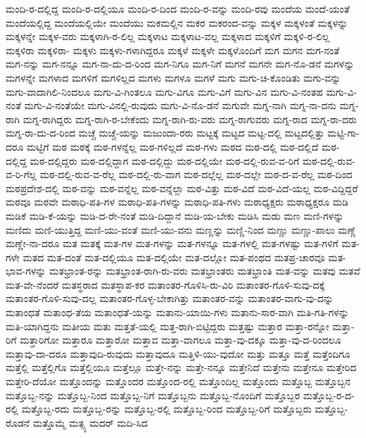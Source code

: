 {ಮಂದಿ-ರ-ದಲ್ಲಿದ್ದ
ಮಂದಿ-ರ-ದಲ್ಲಿಯೂ
ಮಂದಿ-ರ-ದಿಂದ
ಮಂದಿ-ರ-ವನ್ನು
ಮಂದಿ-ರವು
ಮಂದೆಯ
ಮಂದೆ-ಯಂತೆ
ಮಂದೆಯಲ್ಲಿದ್ದ
ಮಂದೆಯಲ್ಲಿಯೇ
ಮಂದೆಯು
ಮಕಮಲ್ಲಿನ
ಮಕರ
ಮಕರಂದ-ವನ್ನು
ಮಕ್ಕಳ
ಮಕ್ಕಳಂತೆ
ಮಕ್ಕಳನ್ನು
ಮಕ್ಕಳನ್ನೇ
ಮಕ್ಕಳ-ವರು
ಮಕ್ಕಳಾಗಿ-ರ-ಲಿಲ್ಲ
ಮಕ್ಕಳಾಟ
ಮಕ್ಕಳಾಟ-ವಲ್ಲ
ಮಕ್ಕಳಾದ
ಮಕ್ಕಳಿಗೆ
ಮಕ್ಕಳಿ-ರ-ಲಿಲ್ಲ
ಮಕ್ಕಳಿರಾ
ಮಕ್ಕಳಿರಾ-
ಮಕ್ಕಳು
ಮಕ್ಕಳು-ಗಳಾಗಿದ್ದರೂ
ಮಕ್ಕಳೆ
ಮಕ್ಕಳೇ
ಮಕ್ಕಳೊಂದಿಗೆ
ಮಗ
ಮಗನ
ಮಗ-ನಂತೆ
ಮಗ-ನನ್ನು
ಮಗ-ನನ್ನೂ
ಮಗ-ನಾ-ದು-ದ-ರಿಂದ
ಮಗ-ನಿಗೂ
ಮಗ-ನಿಗೆ
ಮಗನೆ
ಮಗನೇ
ಮಗ-ನೊ-ಡನೆ
ಮಗಳನ್ನು
ಮಗಳನ್ನೇ
ಮಗಳಾದ
ಮಗಳಿಗೆ
ಮಗಳಿಲ್ಲದ
ಮಗಳು
ಮಗಳೂ
ಮಗಳೆ
ಮಗು
ಮಗು-ಚಿ-ಕೊಂಡಿತು
ಮಗು-ವನ್ನು
ಮಗು-ವಾದಾಗಿಲಿ-ನಿಂದಲೂ
ಮಗು-ವಿ-ಗಿಂತಲೂ
ಮಗು-ವಿಗೂ
ಮಗು-ವಿಗೆ
ಮಗು-ವಿನ
ಮಗು-ವಿ-ನಂತಹ
ಮಗು-ವಿ-ನಂತೆ
ಮಗು-ವಿ-ನಂತೆಯೇ
ಮಗು-ವಿನಲ್ಲಿ-ರುವುದು
ಮಗು-ವಿ-ನೊ-ಡನೆ
ಮಗುವೇ
ಮಗ್ನ-ನಾಗಿ
ಮಗ್ನ-ನಾ-ದನು
ಮಗ್ನ-ರಾಗಿ
ಮಗ್ನ-ರಾಗಿದ್ದರು
ಮಗ್ನ-ರಾಗಿ-ರ-ಬೇಕೆಂದು
ಮಗ್ನ-ರಾಗಿ-ರು-ವರು
ಮಗ್ನ-ರಾಗುವರು
ಮಗ್ನ-ರಾದ
ಮಗ್ನ-ರಾ-ದರು
ಮಗ್ನ-ರಾ-ದು-ದ-ರಿಂದ
ಮಚ್ಚೆ
ಮಚ್ಚೆ-ಯನ್ನು
ಮಜುಂದಾ-ರರು
ಮಟ್ಟಕ್ಕೆ
ಮಟ್ಟದ
ಮಟ್ಟ-ದಲ್ಲಿ
ಮಟ್ಟದಲ್ಲಿತ್ತು
ಮಟ್ಟಿ-ಗಾ-ದರೂ
ಮಟ್ಟಿಗೆ
ಮಠ
ಮಠಕ್ಕೆ
ಮಠ-ಗಳನ್ನೆಲ್ಲ
ಮಠ-ಗಳಿಲ್ಲದೆ
ಮಠ-ಗಳು
ಮಠದ
ಮಠ-ದಲ್ಲಿ
ಮಠ-ದಲ್ಲಿದೆ
ಮಠ-ದಲ್ಲಿದ್ದ
ಮಠ-ದಲ್ಲಿದ್ದರು
ಮಠ-ದಲ್ಲಿದ್ದಾಗ
ಮಠ-ದಲ್ಲಿದ್ದು
ಮಠ-ದಲ್ಲಿಯೇ
ಮಠ-ದಲ್ಲಿ-ರುವ-ವ-ರಿಗೆ
ಮಠ-ದಲ್ಲಿ-ರುವ-ವ-ರಿ-ಗೆಲ್ಲ
ಮಠ-ದಲ್ಲಿ-ರುವ-ವ-ರೆಲ್ಲ
ಮಠ-ದಲ್ಲಿ-ರು-ವಾಗ
ಮಠ-ದಲ್ಲೆಲ್ಲ
ಮಠ-ದಲ್ಲೇ
ಮಠ-ದ-ವ-ರೆಲ್ಲ
ಮಠ-ದಿಂದ
ಮಠಪ್ರದೇಶ-ದಲ್ಲಿ
ಮಠ-ವನ್ನು
ಮಠ-ವನ್ನೆಲ್ಲ
ಮಠ-ವನ್ನೆಲ್ಲಾ
ಮಠ-ವಿತ್ತು
ಮಠ-ವಿದೆ
ಮಠ-ವಿದೆ-ಯಲ್ಲ
ಮಠ-ವಿದ್ದಿದ್ದರೆ
ಮಠವೂ
ಮಠವೇ
ಮಠಾಧಿ-ಪತಿ-ಗಳ
ಮಠಾಧಿ-ಪತಿ-ಗಳನ್ನು
ಮಠಾಧಿ-ಪತಿ-ಗಳು
ಮಠಾಧ್ಯಕ್ಷರು
ಮಠಾಧ್ಯಕ್ಷರೂ
ಮಡಿ
ಮಡಿಕೆ
ಮಡಿ-ಕೆ-ಯನ್ನು
ಮಡಿ-ದ-ರೇ-ನಂತೆ
ಮಡಿ-ದಿದ್ದಾನೆ
ಮಡಿ-ಯ-ಬೇಕು
ಮಡಿಸಿ
ಮಡು
ಮಣ
ಮಣಿ-ಗಳನ್ನು
ಮಣಿದು
ಮಣಿ-ಯುತ್ತಿದ್ದ
ಮಣಿ-ಯು-ವಂತೆ
ಮಣಿ-ಯು-ವನು
ಮಣ್ಣನ್ನು
ಮಣ್ಣಿ-ನಿಂದ
ಮಣ್ಣು
ಮಣ್ಣು-ಪಾಲು
ಮಣ್ಣೆ
ಮಣ್ಣೇ-ನಾ-ದರೂ
ಮತ
ಮತಕ್ಕೆ
ಮತ-ಗಳ
ಮತ-ಗಳನ್ನು
ಮತ-ಗಳನ್ನೂ
ಮತ-ಗಳಲ್ಲಿ
ಮತ-ಗಳಷ್ಟು
ಮತ-ಗಳಿಗೆ
ಮತ-ಗಳೇ
ಮತದ
ಮತ-ದಂತೆ
ಮತ-ದಲ್ಲಿಯೂ
ಮತ-ದಲ್ಲಿಯೇ
ಮತ-ದಲ್ಲೋ
ಮತ-ಪಂಥದ
ಮತಪ್ರ-ಚಾರವೂ
ಮತ-ಭಾವ-ಗಳನ್ನು
ಮತಭ್ರಾಂತ-ರನ್ನು
ಮತಭ್ರಾಂತ-ರಾಗಿ-ರು-ವರು
ಮತಭ್ರಾಂತರು
ಮತಭ್ರಾಂತಿ
ಮತ-ವನ್ನು
ಮತವು
ಮತವೆ
ಮತ-ವೇ-ನೆಂದರೆ
ಮತಸ್ಥರಾದ
ಮತಸ್ಥಾಪ-ಕರ
ಮತಾಂತರ-ಗೊಳಿಸಿ-ರು-ವಿರಿ
ಮತಾಂತರ-ಗೊಳಿ-ಸುವು-ದಕ್ಕೆ
ಮತಾಂತರ-ಗೊಳಿ-ಸುವು-ದಲ್ಲ
ಮತಾಂತರ-ಗೊಳ್ಳ-ಬೇಕಾಗಿತ್ತು
ಮತಾಂತರ-ವನ್ನು
ಮತಾಂತರ-ವಾಗು-ವು-ದನ್ನು
ಮತಾಂಧತೆ
ಮತಾಂಧ-ತೆಯ
ಮತಾಂಧತೆ-ಯನ್ನು
ಮತಾನು-ಯಾಯಿ-ಗಳು
ಮತಾನು-ಸಾರ-ವಾಗಿ
ಮತಿ-ಗತಿ-ಗಳನ್ನು
ಮತಿ-ಯಾಗಿದ್ದನು
ಮತೀಯ
ಮತು
ಮತ್ತತೆ-ಯಲ್ಲಿ
ಮತ್ತ-ರಾಗಿ-ಬಿಟ್ಟಿದ್ದರು
ಮತ್ತಷ್ಟು
ಮತ್ತಾರ
ಮತ್ತಾ-ರನ್ನೋ
ಮತ್ತಾ-ರಿಗೆ
ಮತ್ತಾರಿಗೋ
ಮತ್ತಾರೂ
ಮತ್ತಾರೋ
ಮತ್ತಾವ
ಮತ್ತಾ-ವಾಗಲೂ
ಮತ್ತಾ-ವು-ದಕ್ಕೂ
ಮತ್ತಾ-ವು-ದ-ರಿಂದಲೂ
ಮತ್ತಾವು-ದಾ-ದರೂ
ಮತ್ತಾವುದಿ-ರುವುದು
ಮತ್ತಾವುದೂ
ಮತ್ತಿಳಿ-ಯು-ವುದೋ
ಮತ್ತು
ಮತ್ತೂ
ಮತ್ತೆ
ಮತ್ತೆಂದಿಗೂ
ಮತ್ತೆಲ್ಲಿ
ಮತ್ತೆಲ್ಲಿಗೊ
ಮತ್ತೆಲ್ಲಿಯೂ
ಮತ್ತೆಲ್ಲೂ
ಮತ್ತೇ-ನನ್ನು
ಮತ್ತೇ-ನನ್ನೂ
ಮತ್ತೇನಿದೆ
ಮತ್ತೇನು
ಮತ್ತೇನೂ
ಮತ್ತೇರಿದ
ಮತ್ತೇರಿ-ದೆಯೋ
ಮತ್ತೊಂದನ್ನು
ಮತ್ತೊಂದರ
ಮತ್ತೊಂದ-ರಲ್ಲಿ
ಮತ್ತೊಂದಿಲ್ಲ
ಮತ್ತೊಂದು
ಮತ್ತೊಬ್ಬ
ಮತ್ತೊಬ್ಬನ
ಮತ್ತೊಬ್ಬ-ನನ್ನು
ಮತ್ತೊಬ್ಬ-ನಿಂದ
ಮತ್ತೊಬ್ಬ-ನಿಗೆ
ಮತ್ತೊಬ್ಬನು
ಮತ್ತೊಬ್ಬ-ನೊಂದಿಗೆ
ಮತ್ತೊಬ್ಬರ
ಮತ್ತೊಬ್ಬ-ರ-ದ-ರಲ್ಲಿ
ಮತ್ತೊಬ್ಬ-ರದು
ಮತ್ತೊಬ್ಬ-ರನ್ನು
ಮತ್ತೊಬ್ಬ-ರಲ್ಲಿ
ಮತ್ತೊಬ್ಬ-ರಿಂದ
ಮತ್ತೊಬ್ಬ-ರಿಗೆ
ಮತ್ತೊಬ್ಬರು
ಮತ್ತೊಬ್ಬ-ರೊಡನೆ
ಮತ್ತೊಮ್ಮೆ
ಮತ್ಸ್ಯ
ಮದರ್
ಮದಿ-ಸಿದ
}
